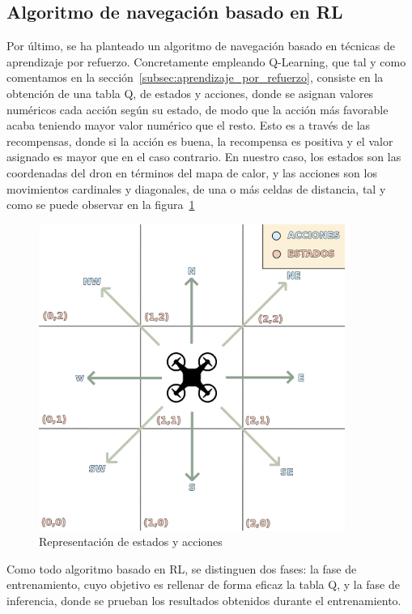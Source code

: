 \subsection{Algoritmo de navegación basado en \ac{RL}}
\label{subsec:alg-q}

Por último, se ha planteado un algoritmo de navegación basado en técnicas de aprendizaje por refuerzo. Concretamente empleando Q-Learning, que tal y como comentamos en la sección~\ref{subsec:aprendizaje_por_refuerzo}, consiste en la obtención de una tabla Q, de estados y acciones, donde se asignan valores numéricos cada acción según su estado, de modo que la acción más favorable acaba teniendo mayor valor numérico que el resto. Esto es a través de las recompensas, donde si la acción es buena, la recompensa es positiva y el valor asignado es mayor que en el caso contrario. En nuestro caso, los estados son las coordenadas del dron en términos del mapa de calor, y las acciones son los movimientos cardinales y diagonales, de una o más celdas de distancia, tal y como se puede observar en la figura~\ref{fig:expl_q}\\

\begin{figure} [t]
    \begin{center}
    \includegraphics[height=10cm]{imagenes/cap4/6_act_st.png}
    \end{center}
    \caption[Representación de estados y acciones]{Representación de estados y acciones}
    \label{fig:expl_q}
\end{figure}

Como todo algoritmo basado en \ac{RL}, se distinguen dos fases: la fase de entrenamiento, cuyo objetivo es rellenar de forma eficaz la tabla Q, y la fase de inferencia, donde se prueban los resultados obtenidos durante el entrenamiento.\\

